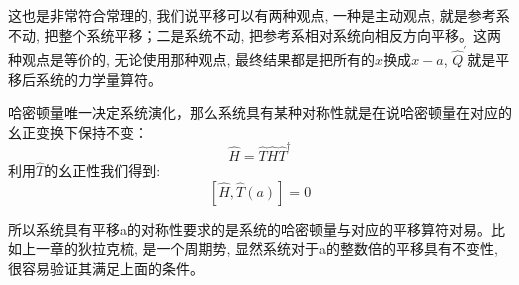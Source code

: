\documentclass[a4paper,zihao=-4,linespread=1]{ctexrep}
\begin{document}
    这也是非常符合常理的, 我们说平移可以有两种观点, 一种是主动观点, 就是参考系不动, 把整个系统平移；二是系统不动, 把参考系相对系统向相反方向平移。这两种观点是等价的,
    无论使用那种观点, 最终结果都是把所有的$x$换成$x-a$, $\hat{Q}^\prime$就是平移后系统的力学量算符。

%
%    
    
    哈密顿量唯一决定系统演化，那么系统具有某种对称性就是在说哈密顿量在对应的幺正变换下保持不变：
    \begin{equation}
        \hat{H}=\hat{T}\hat{H}\hat{T}^\dagger
    \end{equation}
    利用$\hat{T}$的幺正性我们得到:
    \begin{equation}
        \boxed{\left[\hat{H},\hat{T}(a)\right]=0}
    \end{equation}
    
    所以系统具有平移a的对称性要求的是系统的哈密顿量与对应的平移算符对易。比如上一章的狄拉克梳, 是一个周期势, 显然系统对于a的整数倍的平移具有不变性, 很容易验证其满足上面的条件。
    
\end{document}
